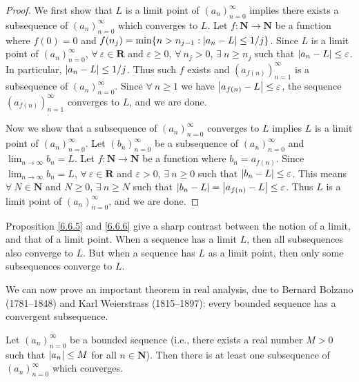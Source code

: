 \begin{proof}
    We first show that \(L\) is a limit point of \((a_n)_{n = 0}^\infty\) implies there exists a subsequence of \((a_n)_{n = 0}^\infty\) which converges to \(L\).
    Let \(f : \mathbf{N} \to \mathbf{N}\) be a function where \(f(0) = 0\) and \(f(n_j) = \min\{n > n_{j - 1} : \abs*{a_n - L} \leq 1 / j\}\).
    Since \(L\) is a limit point of \((a_n)_{n = 0}^\infty\), \(\forall\ \varepsilon \in \mathbf{R}\) and \(\varepsilon \geq 0\), \(\forall\ n_j > 0\), \(\exists\ n \geq n_j\) such that \(\abs*{a_n - L} \leq \varepsilon\).
    In particular, \(\abs*{a_n - L} \leq 1 / j\).
    Thus such \(f\) exists and \((a_{f(n)})_{n = 1}^\infty\) is a subsequence of \((a_n)_{n = 0}^\infty\).
    Since \(\forall\ n \geq 1\) we have \(\abs*{a_{f(n)} - L} \leq \varepsilon\), the sequence \((a_{f(n)})_{n = 1}^\infty\) converges to \(L\), and we are done.

    Now we show that a subsequence of \((a_n)_{n = 0}^\infty\) converges to \(L\) implies \(L\) is a limit point of \((a_n)_{n = 0}^\infty\).
    Let \((b_n)_{n = 0}^\infty\) be a subsequence of \((a_n)_{n = 0}^\infty\) and \(\lim_{n \to \infty} b_n = L\).
    Let \(f : \mathbf{N} \to \mathbf{N}\) be a function where \(b_n = a_{f(n)}\).
    Since \(\lim_{n \to \infty} b_n = L\), \(\forall\ \varepsilon \in \mathbf{R}\) and \(\varepsilon > 0\), \(\exists\ n \geq 0\) such that \(\abs*{b_n - L} \leq \varepsilon\).
    This means \(\forall\ N \in \mathbf{N}\) and \(N \geq 0\), \(\exists\ n \geq N\) such that \(\abs*{b_n - L} = \abs*{a_{f(n)} - L} \leq \varepsilon\).
    Thus \(L\) is a limit point of \((a_n)_{n = 0}^\infty\), and we are done.
\end{proof}

\begin{remark}\label{6.6.7}
    Proposition \ref{6.6.5} and \ref{6.6.6} give a sharp contrast between the notion of a limit, and that of a limit point.
    When a sequence has a limit \(L\), then all subsequences also converge to \(L\).
    But when a sequence has \(L\) as a limit point, then only some subsequences converge to \(L\).
\end{remark}

\begin{note}
    We can now prove an important theorem in real analysis, due to Bernard Bolzano (1781--1848) and Karl Weierstrass (1815--1897):
    every bounded sequence has a convergent subsequence.
\end{note}

\begin{theorem}\label{6.6.8}
    Let \((a_n)_{n = 0}^\infty\) be a bounded sequence
    (i.e., there exists a real number \(M > 0\) such that \(\abs*{a_n} \leq M\) for all \(n \in \mathbf{N}\)).
    Then there is at least one subsequence of \((a_n)_{n = 0}^\infty\) which converges.
\end{theorem}

